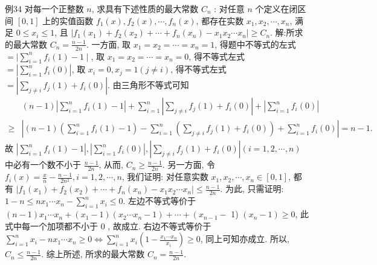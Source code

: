 例34 对每一个正整数 $n$, 求具有下述性质的最大常数 $C_n$ : 对任意 $n$ 个定义在闭区间 $[0,1]$ 上的实值函数 $f_1(x), f_2(x), \cdots, f_n(x)$, 都存在实数 $x_1, x_2, \cdots, x_n$, 满足 $0 \leqslant x_i \leqslant 1$, 且 $\mid f_1\left(x_1\right)+f_2\left(x_2\right)+\cdots+f_n\left(x_n\right)-x_1 x_2 \cdots x_n \mid \geqslant C_n$.
解:所求的最大常数 $C_n=\frac{n-1}{2 n}$.
一方面, 取 $x_1=x_2=\cdots=x_n=1$, 得题中不等式的左式 $=\mid \sum_{i=1}^n f_i(1)-1 \mid$, 取 $x_1=x_2=\cdots=x_n=0$, 得不等式左式 $=\left|\sum_{i=1}^n f_i(0)\right|$, 取 $x_i=0, x_j=1(j \neq i)$, 得不等式左式 $=\left|\sum_{j \neq i} f_j(1)+f_i(0)\right|$. 由三角形不等式可知
$$
\begin{aligned}
& (n-1)\left|\sum_{i=1}^n f_i(1)-1\right|+\sum_{i=1}^n\left|\sum_{j \neq i} f_j(1)+f_i(0)\right|+\left|\sum_{i=1}^n f_i(0)\right| \\
\geqslant & \left|(n-1)\left(\sum_{i=1}^n f_i(1)-1\right)-\sum_{i=1}^n\left(\sum_{j \neq i} f_j(1)+f_i(0)\right)+\sum_{i=1}^n f_i(0)\right|=n-1 .
\end{aligned}
$$
故 $\left|\sum_{i=1}^n f_i(1)-1\right|,\left|\sum_{i=1}^n f_i(0)\right|,\left|\sum_{j \neq i} f_j(1)+f_i(0)\right|(i=1,2, \cdots, n)$ 中必有一个数不小于 $\frac{n-1}{2 n}$, 从而, $C_n \geqslant \frac{n-1}{2 n}$.
另一方面, 令 $f_i(x)=\frac{x}{n}-\frac{n-1}{2 n^2}, i=1,2, \cdots, n$, 我们证明: 对任意实数 $x_1, x_2, \cdots, x_n \in[0,1]$, 都有 $\mid f_1\left(x_1\right)+f_2\left(x_2\right)+\cdots+f_n\left(x_n\right)-x_1 x_2 \cdots x_n \mid \leqslant \frac{n-1}{2 n}$.
为此, 只需证明: $1-n \leqslant n x_1 \cdots x_n-\sum_{i=1}^n x_i \leqslant 0$.
左边不等式等价于 $(n-1) x_1 \cdots x_n+\left(x_1-1\right)\left(x_2 \cdots x_n-1\right)+\cdots+\left(x_{n-1}-\right.$ 1) $\left(x_n-1\right) \geqslant 0$, 此式中每一个加项都不小于 0 , 故成立.
右边不等式等价于 $\sum_{i=1}^n x_i-n x_1 \cdots x_n \geqslant 0 \Leftrightarrow \sum_{i=1}^n x_i\left(1-\frac{x_1 \cdots x_n}{x_i}\right) \geqslant 0$, 同上可知亦成立.
所以, $C_n \leqslant \frac{n-1}{2 n}$.
综上所述, 所求的最大常数 $C_n=\frac{n-1}{2 n}$.


